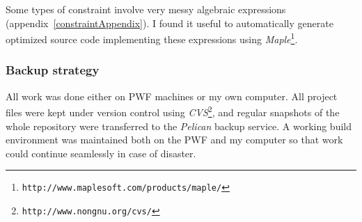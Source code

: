 Some types of constraint involve very messy algebraic expressions
(appendix~\ref{constraintAppendix}). I found it useful to automatically generate optimized source
code implementing these expressions using
\textsl{Maple}\footnote{\texttt{http://www.maplesoft.com/products/maple/}}.

\subsubsection{Backup strategy}
All work was done either on PWF machines or my own computer. All project files were kept under
version control using \textsl{CVS}\footnote{\texttt{http://www.nongnu.org/cvs/}}, and regular
snapshots of the whole repository were transferred to the \textsl{Pelican} backup service.
A working build environment was maintained both on the PWF and my computer so that work could
continue seamlessly in case of disaster.

